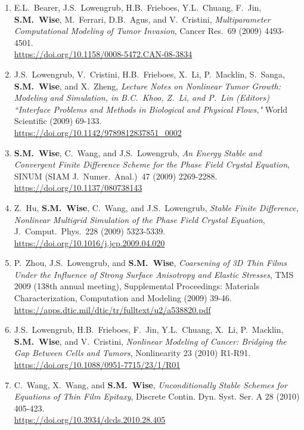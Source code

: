 \documentclass[10pt,letterpaper]{article}
\begin{document}
\begin{enumerate}
	\item
E.L.~Bearer, J.S.~Lowengrub, H.B.~Frieboes, Y.L.~Chuang, F.~Jin, \textbf{S.M.~Wise}, M.~Ferrari, D.B.~Agus, and V.~Cristini, {\sl Multiparameter Computational Modeling of Tumor Invasion}, Cancer Res.~69 (2009) 4493-4501.
	\\
\url{https://doi.org/10.1158/0008-5472.CAN-08-3834}

	\item
J.S.~Lowengrub, V.~Cristini, H.B.~Frieboes, X.~Li, P.~Macklin, S.~Sanga, \textbf{S.M.~Wise}, and X.~Zheng, {\sl Lecture Notes on Nonlinear Tumor Growth: Modeling and Simulation, in  B.C.~Khoo, Z.~Li, and P.~Lin (Editors) ``Interface Problems and Methods in Biological and Physical Flows,"} World Scientific (2009) 69-133.
	\\
\url{https://doi.org/10.1142/9789812837851_0002}

	\item
\textbf{S.M.~Wise}, C.~Wang, and J.S.~Lowengrub, {\sl An Energy Stable and Convergent Finite Difference Scheme for the Phase Field Crystal Equation}, SINUM (SIAM J.~Numer.~Anal.)~47 (2009) 2269-2288.
	\\
\url{https://doi.org/10.1137/080738143}

	\item
Z.~Hu, \textbf{S.M.~Wise}, C.~Wang, and J.S.~Lowengrub, {\sl Stable Finite Difference, Nonlinear Multigrid Simulation of the Phase Field Crystal Equation}, J.~Comput.~Phys.~228 (2009) 5323-5339.
	\\
\url{https://doi.org/10.1016/j.jcp.2009.04.020}

	\item
P.~Zhou, J.S.~Lowengrub, and \textbf{S.M.~Wise}, {\sl Coarsening of 3D Thin Films Under the Influence of Strong Surface Anisotropy and Elastic Stresses}, TMS 2009 (138th annual meeting), Supplemental Proceedings: Materials Characterization, Computation and Modeling (2009) 39-46.
	\\
\url{https://apps.dtic.mil/dtic/tr/fulltext/u2/a538820.pdf}

	\item
J.S.~Lowengrub, H.B.~Frieboes, F.~Jin, Y.L.~Chuang, X.~Li, P.~Macklin, \textbf{S.M.~Wise}, and V.~Cristini, {\sl Nonlinear Modeling of Cancer: Bridging the Gap Between Cells and Tumors}, Nonlinearity 23 (2010) R1-R91.
	\\
\url{https://doi.org/10.1088/0951-7715/23/1/R01}

	\item
C.~Wang, X.~Wang, and \textbf{S.M.~Wise}, {\sl Unconditionally Stable Schemes for Equations of Thin Film Epitaxy}, Discrete Contin. Dyn. Syst. Ser. A 28 (2010) 405-423.
	\\
\url{https://doi.org/10.3934/dcds.2010.28.405}


\end{enumerate}
\end{document}
